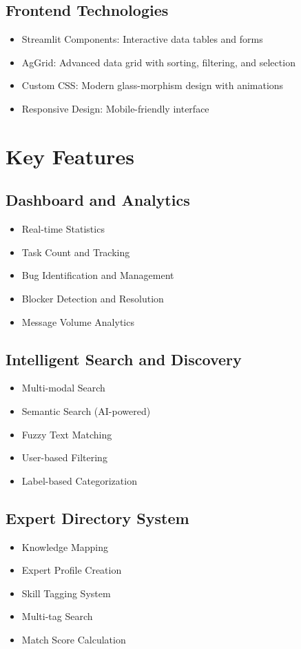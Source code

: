 \documentclass[12pt,a4paper]{article}
\begin{document}
\subsection{Frontend Technologies}
\begin{itemize}
    \item Streamlit Components: Interactive data tables and forms
    \item AgGrid: Advanced data grid with sorting, filtering, and selection
    \item Custom CSS: Modern glass-morphism design with animations
    \item Responsive Design: Mobile-friendly interface
\end{itemize}
\section{Key Features}
\subsection{Dashboard and Analytics}
\begin{itemize}
    \item Real-time Statistics
    \item Task Count and Tracking
    \item Bug Identification and Management
    \item Blocker Detection and Resolution
    \item Message Volume Analytics
\end{itemize}
\subsection{Intelligent Search and Discovery}
\begin{itemize}
    \item Multi-modal Search
    \item Semantic Search (AI-powered)
    \item Fuzzy Text Matching
    \item User-based Filtering
    \item Label-based Categorization
\end{itemize}
\subsection{Expert Directory System}
\begin{itemize}
    \item Knowledge Mapping
    \item Expert Profile Creation
    \item Skill Tagging System
    \item Multi-tag Search
    \item Match Score Calculation
\end{itemize}
\end{document}
